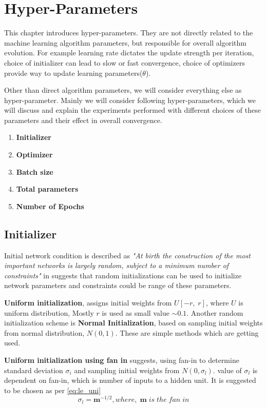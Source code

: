 
\chapter{Hyper-Parameters}\label{chap:hyperparams}
\noindent This chapter introduces hyper-parameters. They are not directly related to the machine learning algorithm parameters, but responsible for overall algorithm evolution. For example learning rate dictates the update strength per iteration, choice of initializer can lead to slow or fast convergence, choice of optimizers provide way to update learning parameters($\theta$).

\noindent Other than direct algorithm parameters, we will consider everything else as hyper-parameter. Mainly we will consider following hyper-parameters, which we will discuss and explain the experiments performed with different choices of these parameters and their effect in overall convergence.

\begin{enumerate}
	\item \textbf{Initializer}
	\item \textbf{Optimizer}
	\item \textbf{Batch size}
	\item \textbf{Total parameters}
	\item \textbf{Number of Epochs}
\end{enumerate}

\section{Initializer}

\noindent Initial network condition is described as \textit{"At birth the construction of the most important networks is largely random, subject to a minimum number of constraints"} in \cite{Rosenblatt58theperceptron:} suggests that random initializations can be used to initialize network parameters and constraints could be range of these parameters.

\noindent \textbf{Uniform initialization}, assigns initial weights from $U[-r,\; r]$, where $U$ is uniform distribution, Mostly $r$ is used as small value $\sim0.1$. Another random initialization scheme is \textbf{Normal Initialization}, based on sampling initial weights from normal distribution, $N(0,1)$. These are simple methods which are getting used.

\noindent \textbf{Uniform initialization using fan in} \cite{LeCun:1998:EB:645754.668382} suggests, using fan-in to determine standard deviation $\sigma_i$ and sampling initial weights from $N(0,\sigma_l)$. value of $\sigma_l$ is dependent on fan-in, which is number of inputs to a hidden unit. It is suggested to be chosen as per \ref{eq:le_uni}
\begin{equation}\label{eq:le_uni}
	\sigma_l=\textbf{m}^{-1/2}, where, \; \textbf{m} \; is \; the \; fan \; in
\end{equation}

